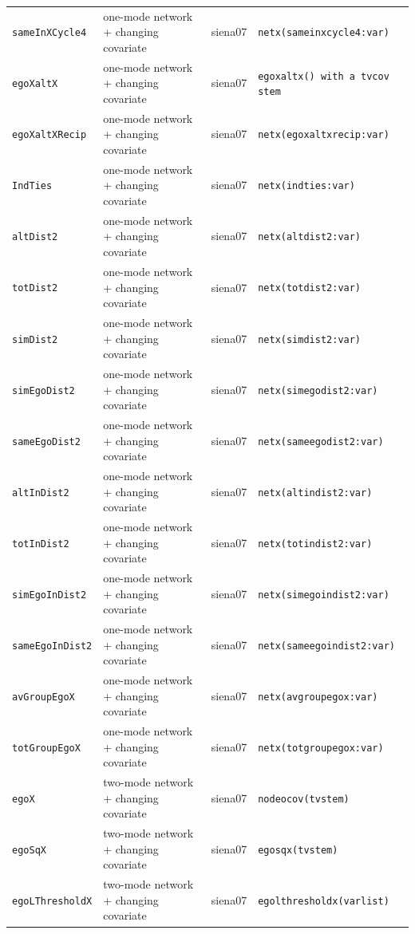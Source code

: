 \begin{longtable}{@{}p{2.6cm}p{3.2cm}p{2.9cm}p{5.4cm}@{}}
\texttt{sameInXCycle4} & one-mode network + changing covariate & siena07 & \texttt{netx(sameinxcycle4:var)}\\
\texttt{egoXaltX} & one-mode network + changing covariate & siena07 & \texttt{egoxaltx() with a tvcov stem}\\
\texttt{egoXaltXRecip} & one-mode network + changing covariate & siena07 & \texttt{netx(egoxaltxrecip:var)}\\
\texttt{IndTies} & one-mode network + changing covariate & siena07 & \texttt{netx(indties:var)}\\
\texttt{altDist2} & one-mode network + changing covariate & siena07 & \texttt{netx(altdist2:var)}\\
\texttt{totDist2} & one-mode network + changing covariate & siena07 & \texttt{netx(totdist2:var)}\\
\texttt{simDist2} & one-mode network + changing covariate & siena07 & \texttt{netx(simdist2:var)}\\
\texttt{simEgoDist2} & one-mode network + changing covariate & siena07 & \texttt{netx(simegodist2:var)}\\
\texttt{sameEgoDist2} & one-mode network + changing covariate & siena07 & \texttt{netx(sameegodist2:var)}\\
\texttt{altInDist2} & one-mode network + changing covariate & siena07 & \texttt{netx(altindist2:var)}\\
\texttt{totInDist2} & one-mode network + changing covariate & siena07 & \texttt{netx(totindist2:var)}\\
\texttt{simEgoInDist2} & one-mode network + changing covariate & siena07 & \texttt{netx(simegoindist2:var)}\\
\texttt{sameEgoInDist2} & one-mode network + changing covariate & siena07 & \texttt{netx(sameegoindist2:var)}\\
\texttt{avGroupEgoX} & one-mode network + changing covariate & siena07 & \texttt{netx(avgroupegox:var)}\\
\texttt{totGroupEgoX} & one-mode network + changing covariate & siena07 & \texttt{netx(totgroupegox:var)}\\
\texttt{egoX} & two-mode network + changing covariate & siena07 & \texttt{nodeocov(tvstem)}\\
\texttt{egoSqX} & two-mode network + changing covariate & siena07 & \texttt{egosqx(tvstem)}\\
\texttt{egoLThresholdX} & two-mode network + changing covariate & siena07 & \texttt{egolthresholdx(varlist)}\\

\end{longtable}
